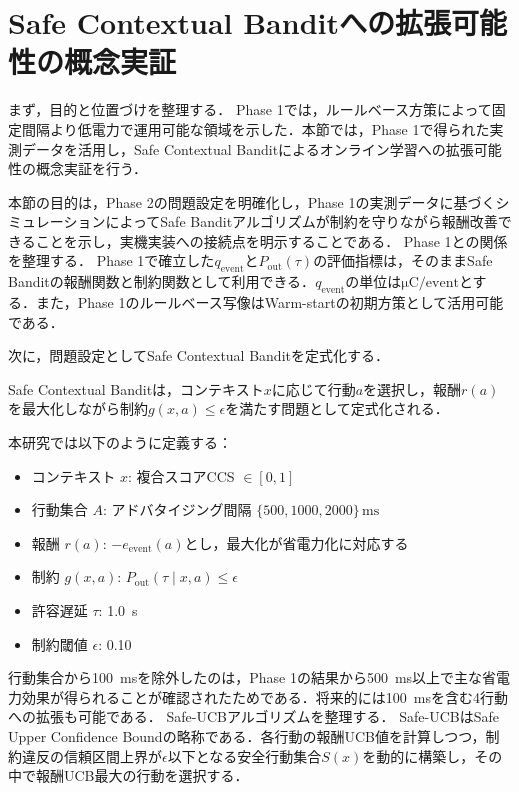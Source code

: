 \section{Safe Contextual Banditへの拡張可能性の概念実証}
\label{sec:phase2_concept}

まず，目的と位置づけを整理する．
Phase 1では，ルールベース方策によって固定間隔より低電力で運用可能な領域を示した．本節では，Phase 1で得られた実測データを活用し，Safe Contextual Banditによるオンライン学習への拡張可能性の概念実証を行う．

本節の目的は，Phase 2の問題設定を明確化し，Phase 1の実測データに基づくシミュレーションによってSafe Banditアルゴリズムが制約を守りながら報酬改善できることを示し，実機実装への接続点を明示することである．
Phase 1との関係を整理する．
Phase 1で確立した$q_{\mathrm{event}}$と$P_{\mathrm{out}}(\tau)$の評価指標は，そのままSafe Banditの報酬関数と制約関数として利用できる．$q_{\mathrm{event}}$の単位は$\si{\micro\coulomb}/\text{event}$とする．また，Phase 1のルールベース写像はWarm-startの初期方策として活用可能である．

次に，問題設定としてSafe Contextual Banditを定式化する．
\label{sec:safe_bandit_formulation}

Safe Contextual Banditは，コンテキスト$x$に応じて行動$a$を選択し，報酬$r(a)$を最大化しながら制約$g(x,a) \le \epsilon$を満たす問題として定式化される．

本研究では以下のように定義する：
\begin{itemize}
  \item コンテキスト $x$: 複合スコアCCS $\in [0,1]$
  \item 行動集合 $A$: アドバタイジング間隔 $\{500, 1000, 2000\}\,\si{\milli\second}$
  \item 報酬 $r(a)$: $-e_{\mathrm{event}}(a)$とし，最大化が省電力化に対応する
  \item 制約 $g(x,a)$: $P_{\mathrm{out}}(\tau \mid x,a) \le \epsilon$
  \item 許容遅延 $\tau$: \SI{1.0}{\second}
  \item 制約閾値 $\epsilon$: 0.10
\end{itemize}

行動集合から\SI{100}{\milli\second}を除外したのは，Phase 1の結果から\SI{500}{\milli\second}以上で主な省電力効果が得られることが確認されたためである．将来的には\SI{100}{\milli\second}を含む4行動への拡張も可能である．
Safe-UCBアルゴリズムを整理する．
Safe-UCBはSafe Upper Confidence Boundの略称である．各行動の報酬UCB値を計算しつつ，制約違反の信頼区間上界が$\epsilon$以下となる安全行動集合$S(x)$を動的に構築し，その中で報酬UCB最大の行動を選択する．


